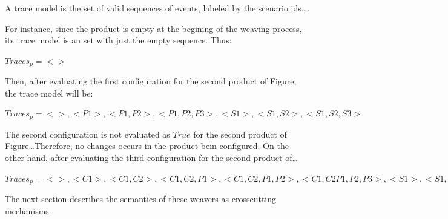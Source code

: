 \documentclass{acm_proc_article-sp}
\begin{document}
\newdef A trace model is the set of valid sequences of events, labeled by the
scenario ids\ldots.

For instance, since the product is empty at the begining of the weaving
process, its trace model is an set with just the empty sequence. Thus:

\begin{center}
$Traces_{p} = {<>}$
\end{center}

Then, after evaluating the first configuration for the second product of
Figure, the trace model will be:

\begin{center}
$Traces_{p} = {<>, <P1>, <P1,P2>, <P1, P2, P3>, <S1>,<S1,S2>, <S1,S2,S3>}$
\end{center}

The second configuration is not evaluated as $True$ for the second product of
Figure\ldots Therefore, no changes occurs in the product bein configured. On the
other hand, after evaluating the third configuration for the second product
of\ldots

\begin{center}
$Traces_{p} = {<>, <C1>, <C1, C2>, <C1,C2,P1>, <C1, C2,P1,P2>, <C1,C2P1, P2,
P3>, <S1>,<S1,S2>, <S1,S2,S3>}$
\end{center}
% 
% 
% 
% 
% 




The next section describes the semantics of these
weavers as crosscutting mechanisms. 


\end{document}
